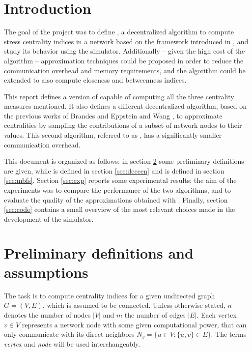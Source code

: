 
\theoremstyle{definition}
\newtheorem*{defcc}{Closeness centrality}
\newtheorem*{defsc}{Stress centrality}
\newtheorem*{defbc}{Betweenness centrality}

\section{Introduction}

The goal of the project was to define \deccen{}, a decentralized algorithm to compute stress centrality indices in a network based on the framework introduced in \citet{lehmann2003}, and study its behavior using the \peersim{} \cite{peersim} simulator. Additionally -- given the high cost of the algorithm -- approximation techniques could be proposed in order to reduce the communication overhead and memory requirements, and the algorithm could be extended to also compute closeness and betweenness indices.

This report defines a version of \deccen{} capable of computing all the three centrality measures mentioned. It also defines a different decentralized algorithm, based on the previous works of Brandes \cite{brandes2001,brandes2007} and Eppstein and Wang \cite{ew2004}, to approximate centralities by sampling the contributions of a subset of network nodes to their values. This second algorithm, referred to as \multibfs{}, has a significantly smaller communication overhead.

This document is organized as follows: in section \ref{sec:def} some preliminary definitions are given, while \deccen{} is defined in section \ref{sec:deccen} and \multibfs{} is defined in section \ref{sec:mbfs}. Section \ref{sec:exp} reports some experimental results: the aim of the experiments was to compare the performance of the two algorithms, and to evaluate the quality of the approximations obtained with \multibfs{}. Finally, section \ref{sec:code} contains a small overview of the most relevant choices made in the development of the simulator.


\section{Preliminary definitions and assumptions}
\label{sec:def}

The task is to compute centrality indices for a given undirected graph $G = (V,E)$, which is assumed to be connected. Unless otherwise stated, $n$ denotes the number of nodes $|V|$ and $m$ the number of edges $|E|$. Each vertex $v \in V$ represents a network node with some given computational power, that can only communicate with its direct neighbors $N_v = \{u \in V : \{u,v\} \in E\}$. The terms \emph{vertex} and \emph{node} will be used interchangeably.


